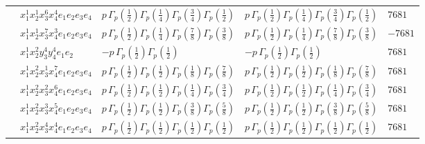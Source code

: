 \documentclass[11pt]{article}
\begin{document}
\begin{table}[ht]
{\begin{tabular}{@{}lllll@{}}
 & $x_{1}^{1} x_{2}^{1} x_{3}^{6} x_{4}^{4}  e_{1} e_{2} e_{3} e_{4}$ & $p \, \Gamma_p \left( \frac{1}{2} \right) \Gamma_p \left( \frac{1}{4} \right) \Gamma_p \left( \frac{3}{4} \right) \Gamma_p \left( \frac{1}{2} \right)$ & $p \, \Gamma_p \left( \frac{1}{2} \right) \Gamma_p \left( \frac{1}{4} \right) \Gamma_p \left( \frac{3}{4} \right) \Gamma_p \left( \frac{1}{2} \right)$ & $7681$ \\
 & $x_{1}^{1} x_{2}^{1} x_{3}^{7} x_{4}^{3}  e_{1} e_{2} e_{3} e_{4}$ & $p \, \Gamma_p \left( \frac{1}{2} \right) \Gamma_p \left( \frac{1}{4} \right) \Gamma_p \left( \frac{7}{8} \right) \Gamma_p \left( \frac{3}{8} \right)$ & $p \, \Gamma_p \left( \frac{1}{2} \right) \Gamma_p \left( \frac{1}{4} \right) \Gamma_p \left( \frac{7}{8} \right) \Gamma_p \left( \frac{3}{8} \right)$ & $-7681$ \\
 & $x_{1}^{1} x_{2}^{2} y_{3}^{4} y_{4}^{4} e_{1} e_{2}$ & $- p \, \Gamma_p \left( \frac{1}{2} \right) \Gamma_p \left( \frac{1}{2} \right)$ & $- p \, \Gamma_p \left( \frac{1}{2} \right) \Gamma_p \left( \frac{1}{2} \right)$ & $7681$ \\
 & $x_{1}^{1} x_{2}^{2} x_{3}^{1} x_{4}^{7}  e_{1} e_{2} e_{3} e_{4}$ & $p \, \Gamma_p \left( \frac{1}{2} \right) \Gamma_p \left( \frac{1}{2} \right) \Gamma_p \left( \frac{1}{8} \right) \Gamma_p \left( \frac{7}{8} \right)$ & $p \, \Gamma_p \left( \frac{1}{2} \right) \Gamma_p \left( \frac{1}{2} \right) \Gamma_p \left( \frac{1}{8} \right) \Gamma_p \left( \frac{7}{8} \right)$ & $7681$ \\
 & $x_{1}^{1} x_{2}^{2} x_{3}^{2} x_{4}^{6}  e_{1} e_{2} e_{3} e_{4}$ & $p \, \Gamma_p \left( \frac{1}{2} \right) \Gamma_p \left( \frac{1}{2} \right) \Gamma_p \left( \frac{1}{4} \right) \Gamma_p \left( \frac{3}{4} \right)$ & $p \, \Gamma_p \left( \frac{1}{2} \right) \Gamma_p \left( \frac{1}{2} \right) \Gamma_p \left( \frac{1}{4} \right) \Gamma_p \left( \frac{3}{4} \right)$ & $7681$ \\
 & $x_{1}^{1} x_{2}^{2} x_{3}^{3} x_{4}^{5}  e_{1} e_{2} e_{3} e_{4}$ & $p \, \Gamma_p \left( \frac{1}{2} \right) \Gamma_p \left( \frac{1}{2} \right) \Gamma_p \left( \frac{3}{8} \right) \Gamma_p \left( \frac{5}{8} \right)$ & $p \, \Gamma_p \left( \frac{1}{2} \right) \Gamma_p \left( \frac{1}{2} \right) \Gamma_p \left( \frac{3}{8} \right) \Gamma_p \left( \frac{5}{8} \right)$ & $7681$ \\
 & $x_{1}^{1} x_{2}^{2} x_{3}^{4} x_{4}^{4}  e_{1} e_{2} e_{3} e_{4}$ & $p \, \Gamma_p \left( \frac{1}{2} \right) \Gamma_p \left( \frac{1}{2} \right) \Gamma_p \left( \frac{1}{2} \right) \Gamma_p \left( \frac{1}{2} \right)$ & $p \, \Gamma_p \left( \frac{1}{2} \right) \Gamma_p \left( \frac{1}{2} \right) \Gamma_p \left( \frac{1}{2} \right) \Gamma_p \left( \frac{1}{2} \right)$ & $7681$ \\

\end{tabular}}
\end{table}
\end{document}
